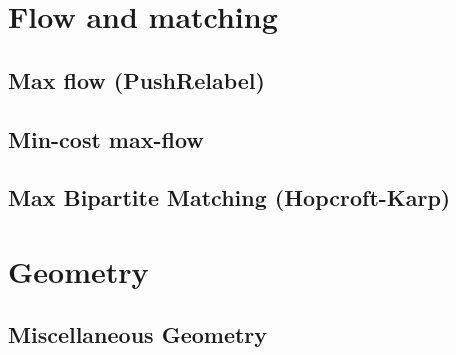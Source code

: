 \documentclass[12pt]{extarticle}
\begin{document}
\begin{multicols*}{2}
\setlength{\parskip}{0.0in}
\setlength{\parskip}{0.0in}
\section{Flow and matching}

\subsection{Max flow (PushRelabel)} %


\subsection{Min-cost max-flow}


\subsection{Max Bipartite Matching (Hopcroft-Karp)} %


\section{Geometry}

\subsection{Miscellaneous Geometry} %



% 



\end{multicols*}
\end{document}
